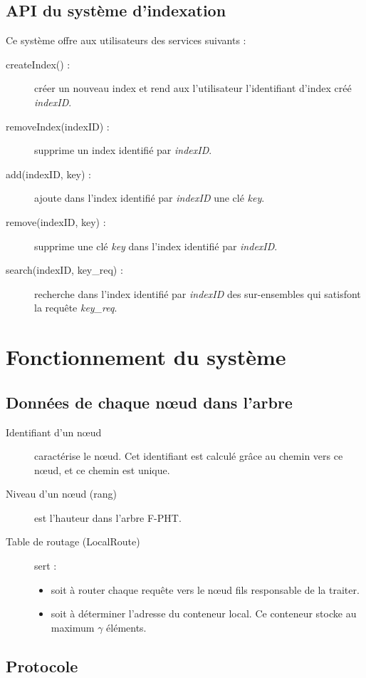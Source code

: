 \documentclass[a4paper,11pt]{report}
\begin{document}
\section{API du système d'indexation}
	Ce système offre aux utilisateurs des services suivants :
	\begin{description}
		\item[	createIndex() 	 :] créer un nouveau index et rend aux l'utilisateur l'identifiant d'index créé \textit{indexID}.
		\item[	removeIndex(indexID)	 :] supprime un index identifié par \textit{indexID}.
		\item[	add(indexID, key) 		 :] ajoute dans l'index identifié par \textit{indexID} une clé \textit{key}.
		\item[	remove(indexID, key)  :] supprime une clé \textit{key} dans l'index identifié par \textit{indexID}.
		\item[	search(indexID, key\_req) 	 :] recherche dans l'index identifié par \textit{indexID} des sur-ensembles qui satisfont la requête \textit{key\_req}.
	\end{description}

	
\chapter{Fonctionnement du système}
\section{Données de chaque nœud dans l'arbre}
	\begin{description}
		\item[Identifiant d'un nœud] caractérise le nœud. Cet identifiant est calculé grâce au chemin vers ce nœud, et ce chemin est unique.
		\item[Niveau d'un nœud (rang)]  est l'hauteur dans l'arbre F-PHT.
		\item[Table de routage (LocalRoute)] sert :
			\begin{itemize}
				\item soit à router chaque requête vers le nœud fils responsable de la traiter.
				\item soit à déterminer l'adresse du conteneur local. Ce conteneur stocke au maximum $\gamma$ éléments.
			\end{itemize}
	\end{description}


\section{Protocole}
\end{document}
